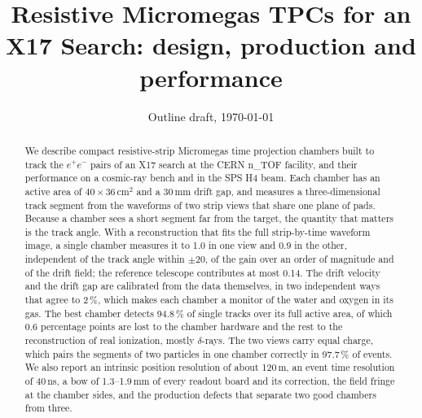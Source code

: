 \documentclass[11pt,a4paper]{article}
\title{Resistive Micromegas TPCs for an X17 Search: design, production and performance}
\author{\tbw{author list -- undecided (C4)}}
\date{Outline draft, \today}
\begin{document}
\maketitle

\begin{abstract}
We describe compact resistive-strip Micromegas time projection chambers built to track the $e^+e^-$ pairs of an X17
search at the CERN n\_TOF facility, and their performance on a cosmic-ray bench and in the SPS H4 beam. Each chamber
has an active area of $40\times36$\,cm$^2$ and a 30\,mm drift gap, and measures a three-dimensional track segment
from the waveforms of two strip views that share one plane of pads. Because a chamber sees a short segment far from
the target, the quantity that matters is the track angle. With a reconstruction that fits the full
strip-by-time waveform image, a single chamber measures it to 1.0\textdegree{} in one view and 0.9\textdegree{} in
the other, independent of the track angle within $\pm20$\textdegree, of the gain over an order of magnitude and of the
drift field; the reference telescope contributes at most 0.14\textdegree. The drift velocity and the drift gap are
calibrated from the data themselves, in two independent ways that agree to 2\,\%, which makes each chamber a monitor
of the water and oxygen in its gas. The best chamber detects 94.8\,\% of single tracks over its full active area, of
which 0.6 percentage points are lost to the chamber hardware and the rest to the reconstruction of real ionization,
mostly $\delta$-rays. The two views carry equal charge, which pairs the segments of two particles in one chamber
correctly in 97.7\,\% of events. We also report an intrinsic position resolution of about 120\,\textmu m, an event
time resolution of 40\,ns, a bow of 1.3--1.9\,mm of every readout board and its correction, the field fringe at the
chamber sides, and the production defects that separate two good chambers from three.
\end{abstract}

\ifdraftnotes
{}
\clearpage
\tableofcontents
\clearpage
\fi












\end{document}
